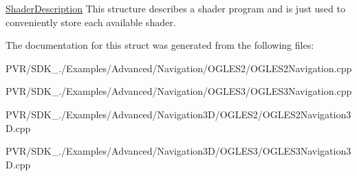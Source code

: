   \hyperlink{struct_shader_description}{Shader\+Description}  This structure describes a shader program and is just used to conveniently store each available shader. 

The documentation for this struct was generated from the following files\+:\begin{DoxyCompactItemize}
\item 
P\+V\+R/\+S\+D\+K\+\_./\+Examples/\+Advanced/\+Navigation/\+O\+G\+L\+E\+S2/O\+G\+L\+E\+S2\+Navigation.\+cpp\item 
P\+V\+R/\+S\+D\+K\+\_./\+Examples/\+Advanced/\+Navigation/\+O\+G\+L\+E\+S3/O\+G\+L\+E\+S3\+Navigation.\+cpp\item 
P\+V\+R/\+S\+D\+K\+\_./\+Examples/\+Advanced/\+Navigation3\+D/\+O\+G\+L\+E\+S2/O\+G\+L\+E\+S2\+Navigation3\+D.\+cpp\item 
P\+V\+R/\+S\+D\+K\+\_./\+Examples/\+Advanced/\+Navigation3\+D/\+O\+G\+L\+E\+S3/O\+G\+L\+E\+S3\+Navigation3\+D.\+cpp\end{DoxyCompactItemize}
